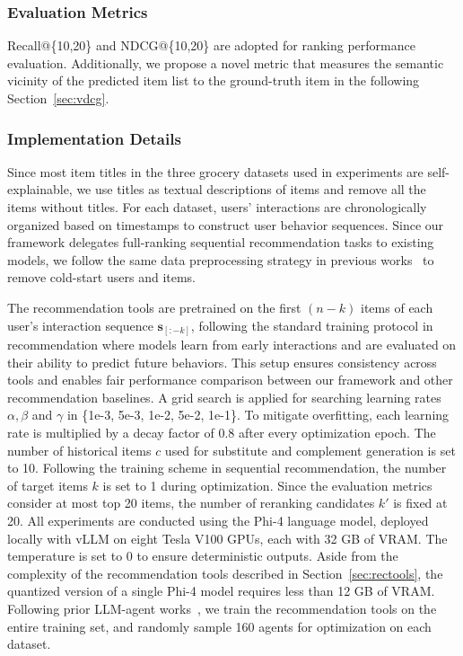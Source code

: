 \subsubsection{Evaluation Metrics}
Recall@\{10,20\} and NDCG@\{10,20\} are adopted for ranking performance evaluation. Additionally, we propose a novel metric that measures the semantic vicinity of the predicted item list to the ground-truth item in the following Section~\ref{sec:vdcg}.

\subsubsection{Implementation Details}
Since most item titles in the three grocery datasets used in experiments are self-explainable, we use titles as textual descriptions of items and remove all the items without titles. For each dataset, users' interactions are chronologically organized based on timestamps to construct user behavior sequences. Since our framework delegates full-ranking sequential recommendation tasks to existing models, we follow the same data preprocessing strategy in previous works~\cite{LightGCN, sasrec, simplex} to remove cold-start users and items.

The recommendation tools are pretrained on the first $(n-k)$ items of each user’s interaction sequence $\mathbf{s}_{[:-k]}$, following the standard training protocol in recommendation where models learn from early interactions and are evaluated on their ability to predict future behaviors. This setup ensures consistency across tools and enables fair performance comparison between our framework and other recommendation baselines.
A grid search is applied for searching learning rates $\alpha, \beta$ and $\gamma$ in \{1e-3, 5e-3, 1e-2, 5e-2, 1e-1\}. 
To mitigate overfitting, each learning rate is multiplied by a decay factor of 0.8 after every optimization epoch. The number of historical items $c$ used for substitute and complement generation is set to 10. Following the training scheme in sequential recommendation, the number of target items $k$ is set to 1 during optimization. Since the evaluation metrics consider at most top 20 items, the number of reranking candidates $k'$ is fixed at 20. All experiments are conducted using the Phi-4 language model, deployed locally with vLLM on eight Tesla V100 GPUs, each with 32 GB of VRAM. The temperature is set to 0 to ensure deterministic outputs.
Aside from the complexity of the recommendation tools described in Section~\ref{sec:rectools}, the quantized version of a single Phi-4 model requires less than 12 GB of VRAM. Following prior LLM-agent works~\cite{agentcf, recagent, interecagent}, we train the recommendation tools on the entire training set, and randomly sample 160 agents for optimization on each dataset.

